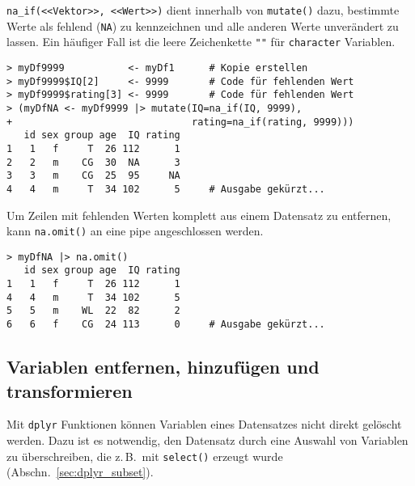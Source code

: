 \lstinline!na_if(<<Vektor>>, <<Wert>>)! dient innerhalb von \lstinline!mutate()! dazu, bestimmte Werte als fehlend (\lstinline!NA!) zu kennzeichnen und alle anderen Werte unverändert zu lassen. Ein häufiger Fall ist die leere Zeichenkette \lstinline!""! für \lstinline!character! Variablen.
\begin{lstlisting}
> myDf9999           <- myDf1      # Kopie erstellen
> myDf9999$IQ[2]     <- 9999       # Code für fehlenden Wert
> myDf9999$rating[3] <- 9999       # Code für fehlenden Wert
> (myDfNA <- myDf9999 |> mutate(IQ=na_if(IQ, 9999),
+                               rating=na_if(rating, 9999)))
   id sex group age  IQ rating
1   1   f     T  26 112      1
2   2   m    CG  30  NA      3
3   3   m    CG  25  95     NA
4   4   m     T  34 102      5     # Ausgabe gekürzt...
\end{lstlisting}

Um Zeilen mit fehlenden Werten komplett aus einem Datensatz zu entfernen, kann \lstinline!na.omit()! an eine pipe angeschlossen werden.
\begin{lstlisting}
> myDfNA |> na.omit()
   id sex group age  IQ rating
1   1   f     T  26 112      1
4   4   m     T  34 102      5
5   5   m    WL  22  82      2
6   6   f    CG  24 113      0     # Ausgabe gekürzt...
\end{lstlisting}

\subsection{Variablen entfernen, hinzufügen und transformieren}
\label{sec:dplyr_transform}

Mit \lstinline!dplyr! Funktionen können Variablen eines Datensatzes nicht direkt gelöscht werden. Dazu ist es notwendig, den Datensatz durch eine Auswahl von Variablen zu überschreiben, die  z.\,B.\ mit \lstinline!select()! erzeugt wurde (Abschn.\ \ref{sec:dplyr_subset}).

